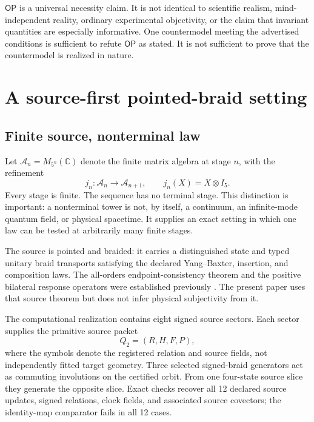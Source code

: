 \documentclass[11pt]{article}
\theoremstyle{definition}
\theoremstyle{remark}
\newcommand{\cA}{\mathcal{A}}
\newcommand{\OPT}{\mathsf{OP}}
\begin{document}
$\OPT$ is a universal necessity claim. It is not identical to scientific realism, mind-independent reality, ordinary experimental objectivity, or the claim that invariant quantities are especially informative. One countermodel meeting the advertised conditions is sufficient to refute $\OPT$ as stated. It is not sufficient to prove that the countermodel is realized in nature.

\section{A source-first pointed-braid setting}

\subsection{Finite source, nonterminal law}

Let $\cA_n=M_{5^n}(\mathbb C)$ denote the finite matrix algebra at stage $n$, with the refinement
\begin{equation}\label{eq:refinement}
 j_n:\cA_n\longrightarrow\cA_{n+1},\qquad j_n(X)=X\otimes I_5.
\end{equation}
Every stage is finite. The sequence has no terminal stage. This distinction is important: a nonterminal tower is not, by itself, a continuum, an infinite-mode quantum field, or physical spacetime. It supplies an exact setting in which one law can be tested at arbitrarily many finite stages.

The source is pointed and braided: it carries a distinguished state and typed unitary braid transports satisfying the declared Yang--Baxter, insertion, and composition laws. The all-orders endpoint-consistency theorem and the positive bilateral response operators were established previously \cite{watanabe2026braid}. The present paper uses that source theorem but does not infer physical subjectivity from it.

The computational realization contains eight signed source sectors. Each sector supplies the primitive source packet
\begin{equation}\label{eq:sourcepacket}
 Q_2=(R,H,F,P),
\end{equation}
where the symbols denote the registered relation and source fields, not independently fitted target geometry. Three selected signed-braid generators act as commuting involutions on the certified orbit. From one four-state source slice they generate the opposite slice. Exact checks recover all 12 declared source updates, signed relations, clock fields, and associated source covectors; the identity-map comparator fails in all 12 cases.
\end{document}
